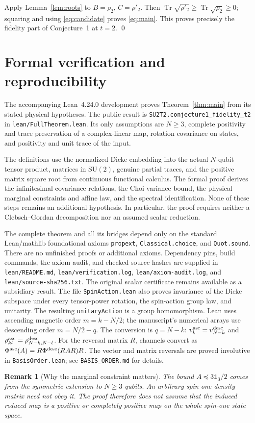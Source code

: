 \documentclass[11pt,a4paper]{article}
\DeclareMathOperator{\Tr}{Tr}
\newcommand{\id}{\mathds{1}}
\newtheorem{remark}{Remark}
\begin{document}
Apply Lemma~\ref{lem:roots} to $B=\rho_2$, $C=\rho'_2$.
Then $\Tr\sqrt{\rho'_2}\ge\Tr\sqrt{\rho_2}\ge0$; squaring and
using \eqref{eq:candidate} proves \eqref{eq:main}.
This proves precisely the fidelity part of Conjecture~1 at $t=2$.
\qed

\section{Formal verification and reproducibility}
The accompanying Lean~4.24.0 development proves
Theorem~\ref{thm:main} from its stated physical hypotheses. The public
result is \texttt{SU2T2.conjecture1\_fidelity\_t2} in
\texttt{lean/FullTheorem.lean}. Its only assumptions are $N\ge3$,
complete positivity and trace preservation of a complex-linear map,
rotation covariance on states, and positivity and unit trace of the input.

The definitions use the normalized Dicke embedding into the actual
$N$-qubit tensor product, matrices in $\mathrm{SU}(2)$, genuine partial
traces, and the positive matrix square root from continuous functional
calculus. The formal proof derives the infinitesimal covariance relations,
the Choi variance bound, the physical marginal constraints and affine
law, and the spectral identification. None of these steps remains an
additional hypothesis. In particular, the proof requires neither a
Clebsch--Gordan decomposition nor an assumed scalar reduction.

The complete theorem and all its bridges depend only on the standard
Lean/mathlib foundational axioms \texttt{propext},
\texttt{Classical.choice}, and \texttt{Quot.sound}. There are no
unfinished proofs or additional axioms. Dependency pins, build commands,
the axiom audit, and checked-source hashes are supplied in
\texttt{lean/README.md}, \texttt{lean/verification.log},
\texttt{lean/axiom-audit.log}, and \texttt{lean/source-sha256.txt}.
The original scalar certificate remains available as a subsidiary result.
The file \texttt{SpinAction.lean} also proves invariance of the Dicke
subspace under every tensor-power rotation, the spin-action group law,
and unitarity. The resulting \texttt{unitaryAction} is a group homomorphism.
Lean uses ascending magnetic order $m=k-N/2$; the manuscript's numerical
arrays use descending order $m=N/2-q$. The conversion is $q=N-k$:
$v^{\rm asc}_k=v^{\rm desc}_{N-k}$ and
$\rho^{\rm asc}_{kl}=\rho^{\rm desc}_{N-k,N-l}$.
For the reversal matrix $R$, channels convert as
$\Phi^{\rm asc}(A)=R\Phi^{\rm desc}(RAR)R$.
The vector and matrix reversals are proved involutive in
\texttt{BasisOrder.lean}; see \texttt{BASIS\_ORDER.md} for details.

\begin{remark}[Why the marginal constraint matters]
The bound $A\preceq3\id_3/2$ comes from the symmetric extension to
$N\ge3$ qubits. An arbitrary spin-one density matrix need not obey it.
The proof therefore does not assume that the induced reduced map is a
positive or completely positive map on the whole spin-one state space.
\end{remark}
\end{document}
